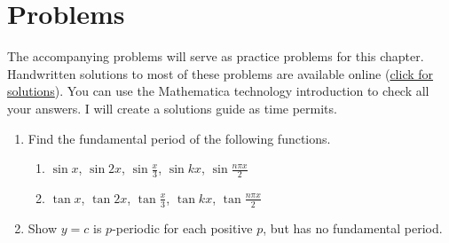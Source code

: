 
\section{Problems}
The accompanying problems will serve as practice problems for this chapter.  Handwritten solutions to most of these problems are available online 
(\href{https://content.byui.edu/file/664390b8-e9cc-43a4-9f3c-70362f8b9735/1/11-Fourier-Series-Preparation-Solutions.pdf}{click for solutions}).
You can use the Mathematica technology introduction to check all your answers. I will create a solutions guide as time permits. 

\begin{enumerate}
	\item Find the fundamental period of the following functions.
	
\begin{enumerate}
	\item $\sin x$, $\sin 2x$, $\sin \frac{x}{3}$, $\sin kx$, $\sin \frac{n\pi x}{2}$
	\item $\tan x$, $\tan 2x$, $\tan \frac{x}{3}$, $\tan kx$, $\tan \frac{n\pi x}{2}$
\end{enumerate}
	\item Show $y=c$ is $p$-periodic for each positive $p$, but has no fundamental period.


\end{enumerate}
